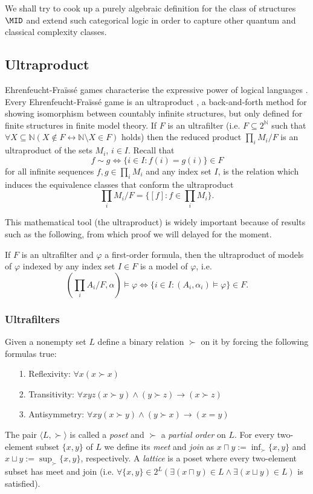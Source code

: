 We shall try to cook up a purely algebraic definition for the class of structures $\MID$ and extend such categorical logic in order to capture other quantum and classical complexity classes. 

\subsection{Ultraproduct}

Ehrenfeucht-Fra\"iss\'e games characterise the expressive power of logical languages \cite{ams}. Every Ehrenfeucht-Fra\"iss\'e game is an ultraproduct \cite{models}, a back-and-forth method for showing isomorphism between countably infinite structures, but only defined for finite structures in finite model theory. If $F$ is an ultrafilter (i.e. $F\subseteq 2^{\mathbb{N}}$ such that $\forall X\subseteq\mathbb{N} (X\notin F \leftrightarrow \mathbb{N}\setminus X\in F)$ holds) then the reduced product $\prod_{i}M_i / F$ is an ultraproduct of the sets $M_i$, $i\in I$. Recall that \[f\sim g \Leftrightarrow \{i\in I : f(i) = g(i)\}\in F\] for all infinite sequences $f,g\in\prod_i M_i$ and any index set $I$, is the relation which induces the equivalence classes that conform the ultraproduct \[\prod_{i}M_i / F = \{[f]:f\in\prod_i M_i\}.\] 

This mathematical tool (the ultraproduct) is widely important because of results such as the following, from which proof we will delayed for the moment.

\begin{lem}[$\L$o\'s Lemma]
If $F$ is an ultrafilter and $\varphi$ a first-order formula, then the ultraproduct of models of $\varphi$ indexed by any index set $I\in F$ is a model of $\varphi$, i.e. \[(\prod_i A_i / F , \alpha)\models\varphi\Leftrightarrow\{i\in I: (A_i, \alpha_i)\models\varphi\}\in F.\]
\end{lem}

\subsubsection{Ultrafilters}
Given a nonempty set $L$ define a binary relation $\succ$ on it by forcing the following formulas true:
\begin{itemize} 
\item[1.] Reflexivity: $\forall x (x\succ x)$
\item[2.] Transitivity: $\forall xyz (x\succ y)\land (y\succ z)\rightarrow (x\succ z)$
\item[3.] Antisymmetry: $\forall xy (x\succ y)\land (y\succ x)\rightarrow (x=y)$ 
\end{itemize}
The pair $\langle L, \succ \rangle$ is called a \emph{poset} and $\succ$ a \emph{partial order} on $L$. For every two-element subset $\{x,y\}$ of $L$ we define its \emph{meet} and \emph{join} as $x\sqcap y := \inf_{\succ}\{x,y\}$ and $x\sqcup y := \sup_{\succ}\{x,y\}$, respectively. A \emph{lattice} is a poset where every two-element subset has meet and join (i.e. $\forall\{x,y\}\in 2^L(\exists (x\sqcap y)\in L\land\exists (x\sqcup y)\in L)$ is satisfied).

